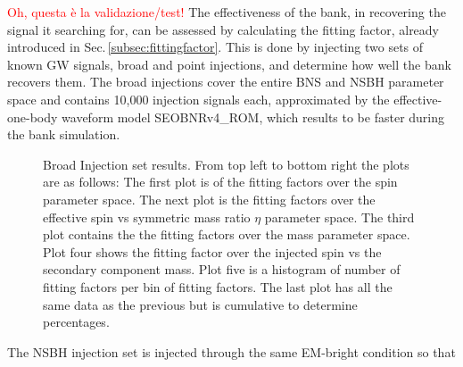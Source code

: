 \documentclass[binding=0.6cm, LaM]{sapthesis}
\newcommand{\fpg}[1]{\textcolor{red}{#1} }
\begin{document}
                \fpg{Oh, questa \`e la validazione/test!}
	The effectiveness of the bank, in recovering the signal it searching for,
        can be assessed by calculating the fitting factor,
        already introduced in Sec.\,\ref{subsec:fittingfactor}.
        This is done by injecting two sets of known GW signals, broad and point injections,
        and determine how well the bank recovers them.
	The broad injections cover the entire BNS and NSBH parameter space and contains 10,000 injection signals each,
	approximated by the effective-one-body waveform model SEOBNRv4\_ROM, 
	which results to be faster during the bank simulation.
        \begin{figure}[!t]
          \noindent
          \label{fittingfactor}
          \centering
          \caption{Broad Injection set results. From top left to bottom right the plots are as follows: The first plot is of the fitting factors over the spin parameter space. The next plot is the fitting factors over the effective spin vs symmetric mass ratio $\eta$ parameter space. The third plot contains the the fitting factors over the mass parameter space. 
Plot four shows the fitting factor over the injected spin vs the secondary component mass. Plot five is a histogram of number of fitting factors per bin of fitting factors. The last plot has all the same data as the previous but is cumulative to determine percentages.}
\label{fig:fittingfactor}
\end{figure}
	The NSBH injection set is injected  through the same EM-bright condition so that
\end{document}
